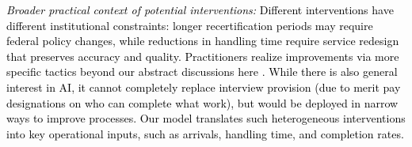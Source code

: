 \documentclass[manuscript,screen,authorversion]{acmart}
\newcommand{\rev}[1]{\textcolor{black}{#1}}
\begin{document}
\rev{\textit{Broader practical context of potential interventions: }%
Different interventions have different institutional constraints: longer recertification periods may require federal policy changes, while reductions in handling time require service redesign that preserves accuracy and quality. 
Practitioners realize improvements via more specific tactics beyond our abstract discussions here \citep{nj-call-centers}. 
While there is also general interest in AI, it cannot completely replace interview provision (due to merit pay designations on who can complete what work), but would be deployed in narrow ways to improve processes.
Our model translates such heterogeneous interventions into key operational inputs, such as arrivals, handling time, and completion rates.
}
\end{document}
